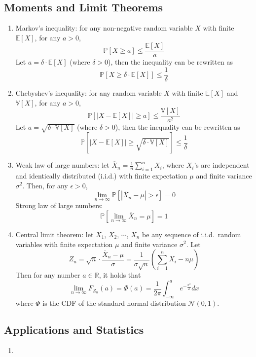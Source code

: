 \documentclass{article}
\begin{document}
\subsection{Moments and Limit Theorems}

\begin{enumerate}
	\item Markov's inequality: for any non-negative random variable $X$ with finite $\mathbb{E}[X]$, for any $a>0$,
		$$\mathbb{P}[X\geq a]\leq\frac{\mathbb{E}[X]}{a}$$
		Let $a=\delta\cdot\mathbb{E}[X]$ (where $\delta>0$), then the inequality can be rewritten as
		$$\mathbb{P}[X\geq\delta\cdot\mathbb{E}[X]]\leq\frac{1}{\delta}$$
		
	\item Chebyshev's inequality: for any random variable $X$ with finite $\mathbb{E}[X]$ and $\mathbb{V}[X]$, for any $a>0$,
		$$\mathbb{P}[|X-\mathbb{E}[X]|\geq a]\leq\frac{\mathbb{V}[X]}{a^2}$$
		Let $a=\sqrt{\delta\cdot\mathbb{V}[X]}$ (where $\delta>0$), then the inequality can be rewritten as
		$$\mathbb{P}\left[|X-\mathbb{E}[X]|\geq\sqrt{\delta\cdot\mathbb{V}[X]}\right]\leq\frac{1}{\delta}$$
	
	\item Weak law of large numbers: let $\overline{X}_n=\frac{1}{n}\sum_{i=1}^{n}X_i$, where $X_i$'s are independent and identically distributed (i.i.d.) with finite expectation $\mu$ and finite variance $\sigma^2$. Then, for any $\epsilon>0$,
		$$\lim_{n\to\infty}\mathbb{P}\left[|\overline{X}_n-\mu|>\epsilon\right]=0$$
		Strong law of large numbers: 
		$$\mathbb{P}\left[\lim_{n\to\infty}\overline{X}_n=\mu\right]=1$$
		
	\item Central limit theorem: let $X_1$, $X_2$, $\cdots$, $X_n$ be any sequence of i.i.d.~random variables with finite expectation $\mu$ and finite variance $\sigma^2$. Let
		$$Z_n=\sqrt{n}\cdot\frac{\overline{X}_n-\mu}{\sigma}=\frac{1}{\sigma\sqrt{n}}\left(\sum_{i=1}^{n}X_i-n\mu\right)$$
		Then for any number $a\in\mathbb{R}$, it holds that 
		$$\lim_{n\to\infty}F_{Z_n}(a)=\Phi(a)=\frac{1}{2\pi}\int_{-\infty}^{a}e^{-\frac{x^2}{2}}dx$$
		where $\Phi$ is the CDF of the standard normal distribution $\mathcal{N}(0,1)$.
\end{enumerate}

\subsection{Applications and Statistics}

\begin{enumerate}
	\item 
\end{enumerate}
\end{document}
